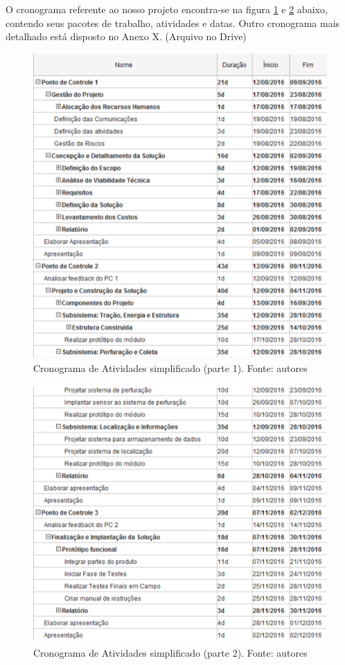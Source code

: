       O cronograma referente ao nosso projeto encontra-se na figura \ref{fig:cron_s1}
      e \ref{fig:cron_s2} abaixo, contendo seus pacotes de trabalho, atividades e datas. Outro
      cronograma mais detalhado está disposto no Anexo X. (Arquivo no Drive)

      \begin{figure}[!htbp]
        \centering
        \includegraphics[width=\textwidth]{figuras/cronograma_simples_1.eps}
        \caption{Cronograma de Atividades simplificado (parte 1). Fonte: autores}
        \label{fig:cron_s1}
      \end{figure}

      \begin{figure}[!htbp]
        \centering
        \includegraphics[width=\textwidth]{figuras/cronograma_simples_2.eps}
        \caption{Cronograma de Atividades simplificado (parte 2). Fonte: autores}
        \label{fig:cron_s2}
      \end{figure}

